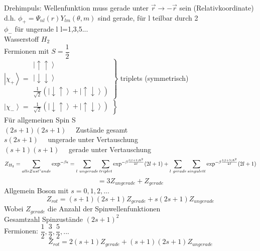 Drehimpuls: Wellenfunktion muss gerade unter $ \vec{r} \rightarrow - \vec{r} $ sein (Relativkoordinate)\\
d.h. $\phi_+ = \Psi_{nl}(r) Y_{lm}(\theta, m)$ sind gerade, für l teilbar durch 2 \\[1.5ex]
$\phi_- $ für ungerade l l=1,3,5... \\[2ex]
Wasserstoff $H_2$ \\[1.5ex]
Fermionen mit $S=\dfrac{1}{2}$ \\[1.5ex]
$\left| \chi_+ \right\rangle = \left. \begin{array}{c} 
\left| \uparrow \uparrow \right\rangle \\
\left| \downarrow \downarrow \right\rangle \\
\frac{1}{\sqrt{2}} (\left| \downarrow \uparrow \right\rangle + \left| \uparrow \downarrow \right\rangle )

\end{array} \right\rbrace $ triplets (symmetrisch) \\
$\left| \chi_- \right\rangle = \left. \begin{array}{c} \frac{1}{\sqrt{2}} (\left| \downarrow \uparrow \right\rangle + \left| \uparrow \downarrow \right\rangle ) \end{array} \right\rbrace $ \\[1.5ex]
Für allgemeinen Spin S \\
$(2s+1)(2s+1) \quad $ Zustände gesamt \\[1.5ex]
$s(2s+1) \quad$ ungerade unter Vertauschung\\[1.5ex]
$(s+1)(s+1) \quad $ gerade unter Vertauschung \\[2ex]
$$Z_{H_2} = \sum \limits _{alle Zust"ande} \exp ^{-\beta \epsilon } = \sum \limits _{l\ ungerade} \sum \limits _ {triplet} \exp^{-\beta \frac{l(l+1)\hbar^2}{2I}}(2l+1) + \sum \limits _{l\ gerade} \sum \limits _ {singulett} \exp^{-\beta \frac{l(l+1)\hbar^2}{2I}}(2l+1)$$ $$ = 3 Z_{ungerade} + Z_{gerade}$$
Allgemein Boson mit $ s= 0,1,2,...$ 
$$ Z_{rot} = (s+1)(2s+1) Z_{gerade} + s(2s+1) Z_{ungerade} $$ Wobei $Z_{gerade}$ die Anzahl der Spinwellenfunktionen \\[1.5ex]
Gesamtzahl Spinzustände $(2s+1)^2$ \\[1.5ex]
Fermionen: $\dfrac{1}{2},\dfrac{3}{2},\dfrac{5}{2}, ...$
$$Z_{rot} = 2(s+1)Z_{gerade} + (s+1)(2s+1) Z_{ungerade} $$ 
